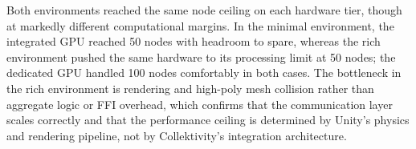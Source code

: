 Both environments reached the same node ceiling on each hardware tier, though at markedly different computational margins. In the minimal environment, the integrated GPU reached 50 nodes with headroom to spare, whereas the rich environment pushed the same hardware to its processing limit at 50 nodes; the dedicated GPU handled 100 nodes comfortably in both cases. The bottleneck in the rich environment is rendering and high-poly mesh collision rather than aggregate logic or \ac{FFI} overhead, which confirms that the communication layer scales correctly and that the performance ceiling is determined by Unity's physics and rendering pipeline, not by Collektivity's integration architecture.
